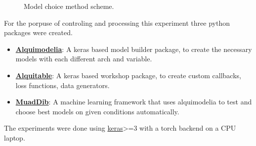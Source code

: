 \begin{figure}[H]
	\centering
	\resizebox{\linewidth}{!}{}
	\caption{Model choice method scheme.}
	\label{fig:method_training}
\end{figure}

For the porpuse of controling and processing this experiment three python packages were created.

\begin{itemize}
    \item \textbf{\href{https://github.com/alquimodelia/alquimodelia}{Alquimodelia}}: A keras based model builder package, to create the necessary models with each different arch and variable.
    \item \textbf{\href{https://github.com/alquimodelia/alquitable}{Alquitable}}: A keras based workshop package, to create custom callbacks, loss functions, data generators.
    \item \textbf{\href{https://github.com/alquimodelia/MuadDib}{MuadDib}}: A machine learning framework that uses alquimodelia to test and choose best models on given conditions automatically.
\end{itemize}

The experiments were done using \href{https://keras.io/}{keras}>=3 with a torch backend on a CPU laptop.





